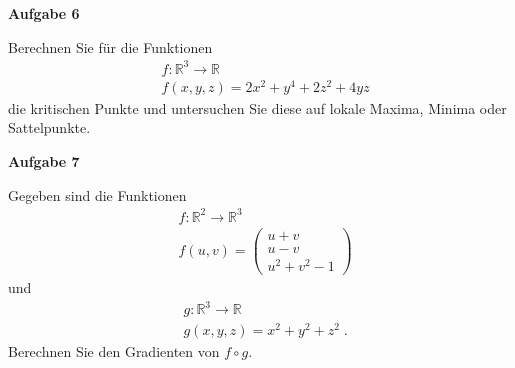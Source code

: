 \documentclass[a4paper,13pt]{scrartcl}
\begin{document}
\vspace{8mm}
{\bf Aufgabe 6}

Berechnen Sie für die Funktionen 
\begin{align*}
& f :  \mathbb{R}^3 \to \mathbb{R} \\
& f(x,y,z) = 2x^2 + y^4 + 2z^2 + 4yz
\end{align*}
die kritischen Punkte und untersuchen Sie diese auf lokale Maxima, Minima oder Sattelpunkte.
\vspace{8mm}

{\bf Aufgabe 7}

Gegeben sind  die Funktionen 
\begin{align*}
& f :  \mathbb{R}^2  \to \mathbb{R}^3 \\
& f(u,v) = \begin{pmatrix}  u +v \\ u -v \\ u^2 + v^2 -1  \end{pmatrix}
\end{align*}
und 
\begin{align*}
& g :  \mathbb{R}^3  \to \mathbb{R} \\
& g(x,y,z) = x^2 + y^2 + z^2 \;. 
\end{align*}
Berechnen Sie den Gradienten von $f \circ g$.
\end{document}
